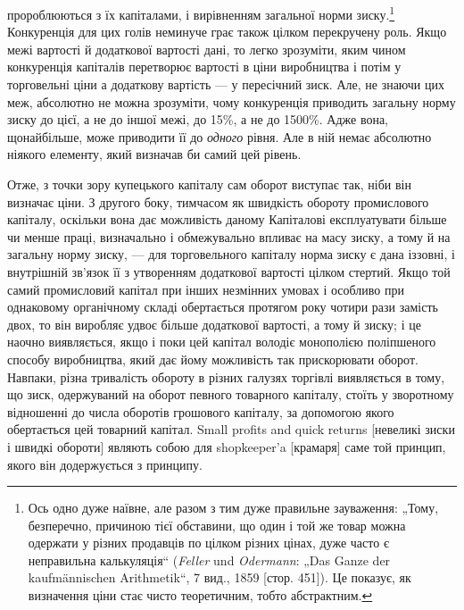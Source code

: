 \parcont{}  %
пророблюються з їх капіталами, і вирівненням загальної норми
зиску.\footnote{
Ось одно дуже наївне, але разом з тим дуже правильне зауваження: „Тому,
безперечно, причиною тієї обставини, що один і той же товар можна одержати
у різних продавців по цілком різних цінах, дуже часто є неправильна калькуляція“
(\emph{Feller} und \emph{Odermann}: „Das Ganze der kaufmännischen Arithmetik“, 7 вид.,
1859 [стор. 451]). Це показує, як визначення ціни стає чисто теоретичним,
тобто абстрактним.
} Конкуренція для цих голів неминуче грає також цілком
перекручену роль. Якщо межі вартості й додаткової вартості
дані, то легко зрозуміти, яким чином конкуренція капіталів перетворює
вартості в ціни виробництва і потім у торговельні ціни
а додаткову вартість — у пересічний зиск. Але, не знаючи цих
меж, абсолютно не можна зрозуміти, чому конкуренція приводить
загальну норму зиску до цієї, а не до іншої межі, до 15\%, а не
до 1500\%. Адже вона, щонайбільше, може приводити її до \emph{одного}
рівня. Але в ній немає абсолютно ніякого елементу, який визначав
би самий цей рівень.

Отже, з точки зору купецького капіталу сам оборот виступає
так, ніби він визначає ціни. З другого боку, тимчасом як швидкість
обороту промислового капіталу, оскільки вона дає можливість
даному Капіталові експлуатувати більше чи менше праці, визначально
і обмежувально впливає на масу зиску, а тому й на
загальну норму зиску, — для торговельного капіталу норма зиску
є дана іззовні, і внутрішній зв’язок її з утворенням додаткової
вартості цілком стертий. Якщо той самий промисловий капітал
при інших незмінних умовах і особливо при однаковому органічному
складі обертається протягом року чотири рази замість
двох, то він виробляє удвоє більше додаткової вартості, а тому
й зиску; і це наочно виявляється, якщо і поки цей капітал володіє
монополією поліпшеного способу виробництва, який дає
йому можливість так прискорювати оборот. Навпаки, різна тривалість
обороту в різних галузях торгівлі виявляється в тому,
що зиск, одержуваний на оборот певного товарного капіталу,
стоїть у зворотному відношенні до числа оборотів грошового
капіталу, за допомогою якого обертається цей товарний капітал.
Small profits and quick returns [невеликі зиски і швидкі обороти]
являють собою для shopkeeper’a [крамаря] саме той принцип,
якого він додержується з принципу.

